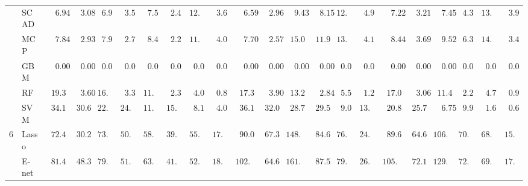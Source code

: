 \begin{tabular}{llllllllllllllllllllll}
	& SCAD  & $\phantom{00}6.94$ & $\phantom{00}3.08$ & $\phantom{0}6.95$ & $\phantom{0}3.59$ & $\phantom{0}7.56$ & $\phantom{0}2.44$ & $12.66$ & $\phantom{0}3.68$ & $\phantom{00}6.59$ & $\phantom{00}2.96$ & $\phantom{00}9.43$ & $\phantom{00}8.15$ & $12.56$ & $\phantom{0}4.93$ & $\phantom{00}7.22$ & $\phantom{00}3.21$ & $\phantom{00}7.45$ & $\phantom{0}4.30$ & $13.44$ & $\phantom{0}3.94$ \\
	& MCP  & $\phantom{00}7.84$ & $\phantom{00}2.93$ & $\phantom{0}7.93$ & $\phantom{0}2.75$ & $\phantom{0}8.43$ & $\phantom{0}2.25$ & $11.63$ & $\phantom{0}4.00$ & $\phantom{00}7.70$ & $\phantom{00}2.57$ & $\phantom{0}15.04$ & $\phantom{0}11.94$ & $13.80$ & $\phantom{0}4.18$ & $\phantom{00}8.44$ & $\phantom{00}3.69$ & $\phantom{00}9.52$ & $\phantom{0}6.32$ & $14.18$ & $\phantom{0}3.40$ \\
	& GBM  & $\phantom{00}0.00$ & $\phantom{00}0.00$ & $\phantom{0}0.00$ & $\phantom{0}0.00$ & $\phantom{0}0.00$ & $\phantom{0}0.00$ & $\phantom{0}0.00$ & $\phantom{0}0.00$ & $\phantom{00}0.00$ & $\phantom{00}0.00$ & $\phantom{00}0.00$ & $\phantom{00}0.00$ & $\phantom{0}0.00$ & $\phantom{0}0.00$ & $\phantom{00}0.00$ & $\phantom{00}0.00$ & $\phantom{00}0.00$ & $\phantom{0}0.00$ & $\phantom{0}0.00$ & $\phantom{0}0.00$ \\
	& RF  & $\phantom{0}19.31$ & $\phantom{00}3.60$ & $16.96$ & $\phantom{0}3.35$ & $11.94$ & $\phantom{0}2.35$ & $\phantom{0}4.09$ & $\phantom{0}0.85$ & $\phantom{0}17.37$ & $\phantom{00}3.90$ & $\phantom{0}13.25$ & $\phantom{00}2.84$ & $\phantom{0}5.55$ & $\phantom{0}1.23$ & $\phantom{0}17.03$ & $\phantom{00}3.06$ & $\phantom{0}11.41$ & $\phantom{0}2.25$ & $\phantom{0}4.79$ & $\phantom{0}0.91$ \\
	& SVM  & $\phantom{0}34.19$ & $\phantom{0}30.66$ & $22.00$ & $24.86$ & $11.83$ & $15.63$ & $\phantom{0}8.12$ & $\phantom{0}4.04$ & $\phantom{0}36.17$ & $\phantom{0}32.02$ & $\phantom{0}28.73$ & $\phantom{0}29.54$ & $\phantom{0}9.09$ & $13.91$ & $\phantom{0}20.86$ & $\phantom{0}25.79$ & $\phantom{00}6.75$ & $\phantom{0}9.91$ & $\phantom{0}1.69$ & $\phantom{0}0.66$ \\
	6 & Lasso  & $\phantom{0}72.43$ & $\phantom{0}30.22$ & $73.15$ & $50.35$ & $58.84$ & $39.48$ & $55.14$ & $17.39$ & $\phantom{0}90.05$ & $\phantom{0}67.36$ & $148.78$ & $\phantom{0}84.60$ & $76.43$ & $24.00$ & $\phantom{0}89.69$ & $\phantom{0}64.66$ & $106.72$ & $70.77$ & $68.24$ & $15.20$ \\
	& E-net  & $\phantom{0}81.40$ & $\phantom{0}48.39$ & $79.47$ & $51.68$ & $63.43$ & $41.85$ & $52.93$ & $18.57$ & $102.83$ & $\phantom{0}64.68$ & $161.21$ & $\phantom{0}87.58$ & $79.27$ & $26.05$ & $105.07$ & $\phantom{0}72.12$ & $129.10$ & $72.49$ & $69.20$ & $17.40$ \\

\end{tabular}
